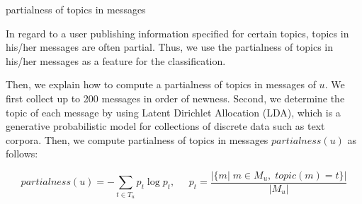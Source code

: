 \begin{description}
\bf {\item[(iv)] partialness of topics in messages}
\end{description}

In regard to a user publishing information specified for certain topics,
topics in his/her messages are often partial.  Thus, we use the
partialness of topics in his/her messages as a feature for the
classification.

Then, we explain how to compute a partialness of topics in messages of
$u$.  We first collect up to 200 messages in order of newness.  Second,
we determine the topic of each message by using Latent Dirichlet
Allocation (LDA), which is a generative probabilistic model for
collections of discrete data such as text corpora.  Then, we compute
partialness of topics in messages $\mathit{partialness}(u)$ as follows:

\vspace{-3ex}
\[
 \mathit{partialness}(u) = - \sum_{t \in T_u} p_t \log p_t,\;\;\;\;\;
 p_t = \frac{|\{m|\;m \in M_u,\;\mathit{topic}(m) = t\}|}{|M_u|}
\]
\vspace{-3ex}

